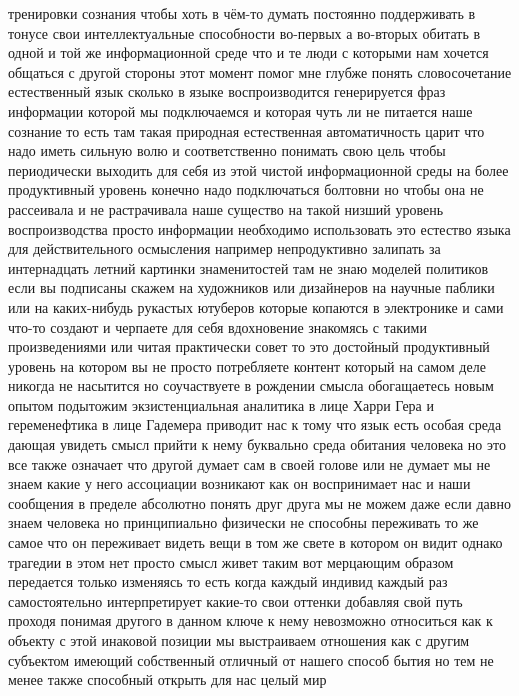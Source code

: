 тренировки сознания чтобы хоть в чём-то думать постоянно поддерживать в тонусе
свои интеллектуальные способности во-первых а во-вторых обитать в одной и той же
информационной среде что и те люди с которыми нам хочется общаться с другой
стороны этот момент помог мне глубже понять словосочетание естественный язык
сколько в языке воспроизводится генерируется фраз информации которой мы
подключаемся и которая чуть ли не питается наше сознание то есть там такая
природная естественная автоматичность царит что надо иметь сильную волю и
соответственно понимать свою цель чтобы периодически выходить для себя из этой
чистой информационной среды на более продуктивный уровень конечно надо
подключаться болтовни но чтобы она не рассеивала и не растрачивала наше существо
на такой низший уровень воспроизводства просто информации необходимо
использовать это естество языка для действительного осмысления например
непродуктивно залипать за интернадцать летний картинки знаменитостей там не знаю
моделей политиков если вы подписаны скажем на художников или дизайнеров на
научные паблики или на каких-нибудь рукастых ютуберов которые копаются в
электронике и сами что-то создают и черпаете для себя вдохновение знакомясь с
такими произведениями или читая практически совет то это достойный продуктивный
уровень на котором вы не просто потребляете контент который на самом деле
никогда не насытится но соучаствуете в рождении смысла обогащаетесь новым опытом
подытожим экзистенциальная аналитика в лице Харри Гера и геременефтика в лице
Гадемера приводит нас к тому что язык есть особая среда дающая увидеть смысл
прийти к нему буквально среда обитания человека но это все также означает что
другой думает сам в своей голове или не думает мы не знаем какие у него
ассоциации возникают как он воспринимает нас и наши сообщения в пределе
абсолютно понять друг друга мы не можем даже если давно знаем человека но
принципиально физически не способны переживать то же самое что он переживает
видеть вещи в том же свете в котором он видит однако трагедии в этом нет просто
смысл живет таким вот мерцающим образом передается только изменяясь то есть
когда каждый индивид каждый раз самостоятельно интерпретирует какие-то свои
оттенки добавляя свой путь проходя понимая другого в данном ключе к нему
невозможно относиться как к объекту с этой инаковой позиции мы выстраиваем
отношения как с другим субъектом имеющий собственный отличный от нашего способ
бытия но тем не менее также способный открыть для нас целый мир 

